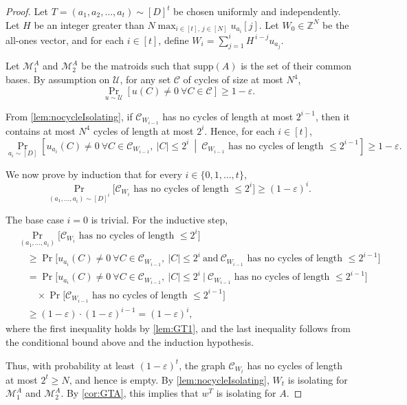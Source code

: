 \documentclass[11pt]{article}
\newcommand{\eps}{\varepsilon}
\renewcommand{\epsilon}{\eps}
\newcommand{\Z}{\mathbb{Z}}
\newcommand{\supp}{\mathrm{supp}}
\begin{document}
\begin{proof}
Let $T=(a_1,a_2,\dots,a_t)\sim [D]^t$ be chosen uniformly and independently. 
Let $H$ be an integer greater than $N\max_{i\in [t],\,j\in [N]} u_{a_i}[j]$. 
Let $W_0\in \Z^N$ be the all-ones vector, and for each $i\in [t]$, define $W_i=\sum_{j=1}^i H^{\,i-j} u_{a_j}$.

Let $\mathcal{M}^A_1$ and $\mathcal{M}^A_2$ be the matroids such that $\supp(A)$ is the set of their common bases. 
By assumption on $\mathcal{U}$, for any set $\mathcal{C}$ of cycles of size at most $N^4$,
\[
\Pr_{u\sim \mathcal{U}}[u(C)\neq 0 \ \forall C\in \mathcal{C}] \ge 1-\epsilon.
\]

From \cref{lem:nocycleIsolating}, if $\mathcal{C}_{W_{i-1}}$ has no cycles of length at most $2^{i-1}$, then it contains at most $N^4$ cycles of length at most $2^i$. Hence, for each $i\in [t]$,
\[
\Pr_{a_i\sim[D]}\!\left[u_{a_i}(C)\neq 0 \ \forall C\in \mathcal{C}_{W_{i-1}},\ |C|\le 2^i
\ \middle|\
\mathcal{C}_{W_{i-1}}\text{ has no cycles of length }\le 2^{i-1}\right]\ge 1-\epsilon.
\]

We now prove by induction that for every $i\in\{0,1,\dots,t\}$,
\[
\Pr_{(a_1,\dots,a_i)\sim[D]^i}\big[\mathcal{C}_{W_i}\text{ has no cycles of length }\le 2^i\big]\ge (1-\epsilon)^i.
\]

The base case $i=0$ is trivial. For the inductive step,
\begin{align*}
&\Pr_{(a_1,\dots,a_i)}\big[\mathcal{C}_{W_i}\text{ has no cycles of length }\le 2^i\big] \\
&\quad \ge 
\Pr\Big[
u_{a_i}(C)\neq 0 \ \forall C\in \mathcal{C}_{W_{i-1}},\ |C|\le 2^i 
\ \text{and}\ 
\mathcal{C}_{W_{i-1}}\text{ has no cycles of length }\le 2^{i-1}
\Big] \\
&\quad =
\Pr\Big[
u_{a_i}(C)\neq 0 \ \forall C\in \mathcal{C}_{W_{i-1}},\ |C|\le 2^i
\ |\
\mathcal{C}_{W_{i-1}}\text{ has no cycles of length }\le 2^{i-1}
\Big] \\
&\qquad \times
\Pr\big[\mathcal{C}_{W_{i-1}}\text{ has no cycles of length }\le 2^{i-1}\big] \\
&\quad \ge (1-\epsilon)\cdot (1-\epsilon)^{i-1} = (1-\epsilon)^i,
\end{align*}
where the first inequality holds by \cref{lem:GT1}, and the last inequality follows from the conditional bound above and the induction hypothesis.

Thus, with probability at least $(1-\epsilon)^t$, the graph $\mathcal{C}_{W_t}$ has no cycles of length at most $2^t\ge N$, and hence is empty. By \cref{lem:nocycleIsolating}, $W_t$ is isolating for $\mathcal{M}^A_1$ and $\mathcal{M}^A_2$. By \cref{cor:GTA}, this implies that $w^T$ is isolating for $A$.
\end{proof}
\end{document}
